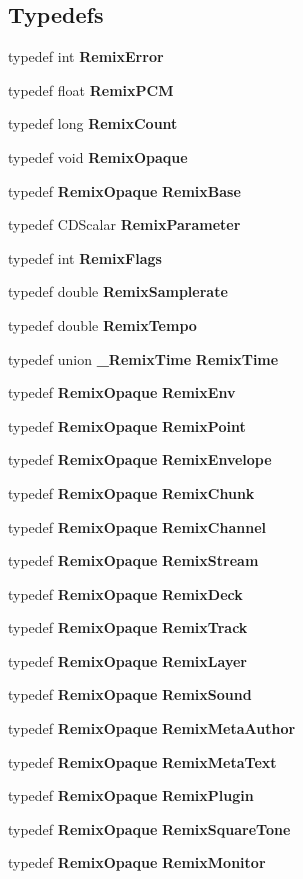 \subsection*{Typedefs}
\begin{DoxyCompactItemize}
\item 
typedef int {\bf RemixError}
\item 
typedef float {\bf RemixPCM}
\item 
typedef long {\bf RemixCount}
\item 
typedef void {\bf RemixOpaque}
\item 
typedef {\bf RemixOpaque} {\bf RemixBase}
\item 
typedef CDScalar {\bf RemixParameter}
\item 
typedef int {\bf RemixFlags}
\item 
typedef double {\bf RemixSamplerate}
\item 
typedef double {\bf RemixTempo}
\item 
typedef union {\bf \_\-RemixTime} {\bf RemixTime}
\item 
typedef {\bf RemixOpaque} {\bf RemixEnv}
\item 
typedef {\bf RemixOpaque} {\bf RemixPoint}
\item 
typedef {\bf RemixOpaque} {\bf RemixEnvelope}
\item 
typedef {\bf RemixOpaque} {\bf RemixChunk}
\item 
typedef {\bf RemixOpaque} {\bf RemixChannel}
\item 
typedef {\bf RemixOpaque} {\bf RemixStream}
\item 
typedef {\bf RemixOpaque} {\bf RemixDeck}
\item 
typedef {\bf RemixOpaque} {\bf RemixTrack}
\item 
typedef {\bf RemixOpaque} {\bf RemixLayer}
\item 
typedef {\bf RemixOpaque} {\bf RemixSound}
\item 
typedef {\bf RemixOpaque} {\bf RemixMetaAuthor}
\item 
typedef {\bf RemixOpaque} {\bf RemixMetaText}
\item 
typedef {\bf RemixOpaque} {\bf RemixPlugin}
\item 
typedef {\bf RemixOpaque} {\bf RemixSquareTone}
\item 
typedef {\bf RemixOpaque} {\bf RemixMonitor}
\end{DoxyCompactItemize}
